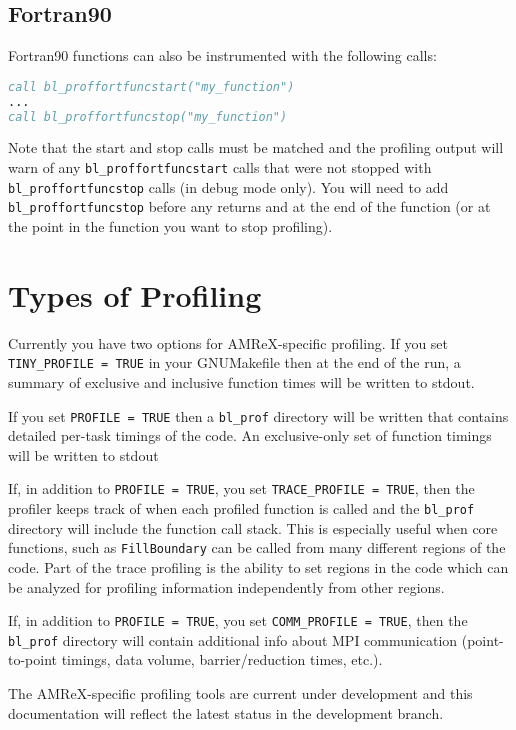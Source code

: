\subsection{Fortran90} 

Fortran90 functions can also be instrumented with the following calls:
 
\begin{lstlisting}[language=fortran]
call bl_proffortfuncstart("my_function")
...
call bl_proffortfuncstop("my_function")
\end{lstlisting}
 
Note that the start and stop calls must be matched and the profiling output will warn of any 
{\tt bl\_proffortfuncstart} calls that were not stopped with {\tt bl\_proffortfuncstop} calls
(in debug mode only).  You will need to add {\tt bl\_proffortfuncstop}
before any returns and at the end of the function 
(or at the point in the function you want to stop profiling). 

\section{Types of Profiling} 

Currently you have two options for AMReX-specific profiling.  If you set {\tt TINY\_PROFILE = TRUE}
in your GNUMakefile then at the end of the run, a summary of exclusive and inclusive function times 
will be written to stdout.

If you set {\tt PROFILE = TRUE} then a {\tt bl\_prof} directory will be written that contains 
detailed per-task timings of the code.    An exclusive-only set of function timings will be written to stdout

If, in addition to  {\tt PROFILE = TRUE}, you set {\tt TRACE\_PROFILE = TRUE}, then the profiler keeps track
of when each profiled function is called and  the {\tt bl\_prof} directory will include the function call stack.   
This is especially useful when core functions, such as {\tt FillBoundary} can be called from many different regions of the code.
Part of the trace profiling is the ability to set regions in the code which can be analyzed for profiling information independently from other regions. 

If, in addition to  {\tt PROFILE = TRUE}, you set {\tt COMM\_PROFILE = TRUE}, then the {\tt bl\_prof} directory 
will contain additional info about MPI communication (point-to-point timings, data volume, barrier/reduction times, etc.).

The AMReX-specific profiling tools are current under development and this documentation will reflect the latest 
status in the development branch.

